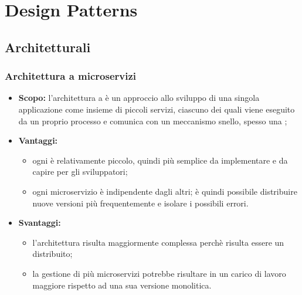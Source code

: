 \section{Design Patterns}
  \subsection{Architetturali}
    \subsubsection{Architettura a microservizi}
      \begin{itemize}
       \item \textbf{Scopo:} l'architettura a  è un approccio allo sviluppo di una singola applicazione come insieme di piccoli servizi, ciascuno dei quali viene eseguito da un proprio processo e comunica con un meccanismo snello, spesso una  ;
       \item \textbf{Vantaggi:}
	      \begin{itemize}
	       \item ogni  è relativamente piccolo, quindi più semplice da implementare e da capire per gli sviluppatori;
	       \item ogni microservizio è indipendente dagli altri; è quindi possibile distribuire nuove versioni più frequentemente e isolare i possibili errori.
	      \end{itemize}

       \item \textbf{Svantaggi:}
	\begin{itemize}
	 \item l'architettura risulta maggiormente complessa perchè risulta essere un  distribuito;
	 \item la gestione di più microservizi potrebbe risultare in un carico di lavoro maggiore rispetto ad una sua versione monolitica.
	\end{itemize}
      \end{itemize}
